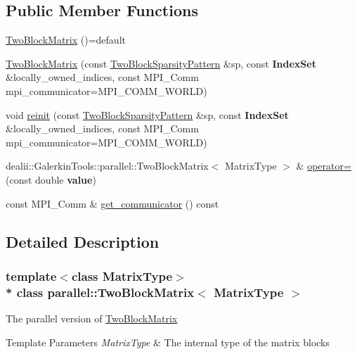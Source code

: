 \subsection*{Public Member Functions}
\begin{DoxyCompactItemize}
\item 
\hyperlink{classparallel_1_1_two_block_matrix_a93990616301e671f9a967fbc49029674}{Two\+Block\+Matrix} ()=default
\item 
\hyperlink{classparallel_1_1_two_block_matrix_afa9b3f1c3d74a211c334c8f6e59b52f6}{Two\+Block\+Matrix} (const \hyperlink{class_two_block_sparsity_pattern}{Two\+Block\+Sparsity\+Pattern} \&sp, const {\bf Index\+Set} \&locally\+\_\+owned\+\_\+indices, const M\+P\+I\+\_\+\+Comm mpi\+\_\+communicator=M\+P\+I\+\_\+\+C\+O\+M\+M\+\_\+\+W\+O\+R\+LD)
\item 
void \hyperlink{classparallel_1_1_two_block_matrix_a0e112695034c69aa8a430efd9e7c37ef}{reinit} (const \hyperlink{class_two_block_sparsity_pattern}{Two\+Block\+Sparsity\+Pattern} \&sp, const {\bf Index\+Set} \&locally\+\_\+owned\+\_\+indices, const M\+P\+I\+\_\+\+Comm mpi\+\_\+communicator=M\+P\+I\+\_\+\+C\+O\+M\+M\+\_\+\+W\+O\+R\+LD)
\item 
dealii\+::\+Galerkin\+Tools\+::parallel\+::\+Two\+Block\+Matrix$<$ Matrix\+Type $>$ \& \hyperlink{classparallel_1_1_two_block_matrix_a8e2ba56ebc9ee5ad1fe7b1d8604e9669}{operator=} (const double {\bf value})
\item 
const M\+P\+I\+\_\+\+Comm \& \hyperlink{classparallel_1_1_two_block_matrix_a4894068aad11986f43c1221cd696dc2a}{get\+\_\+communicator} () const 
\end{DoxyCompactItemize}


\subsection{Detailed Description}
\subsubsection*{template$<$class Matrix\+Type$>$\\*
class parallel\+::\+Two\+Block\+Matrix$<$ Matrix\+Type $>$}

The parallel version of \hyperlink{class_two_block_matrix}{Two\+Block\+Matrix}


\begin{DoxyTemplParams}{Template Parameters}
{\em Matrix\+Type} & The internal type of the matrix blocks \\
\hline
\end{DoxyTemplParams}


